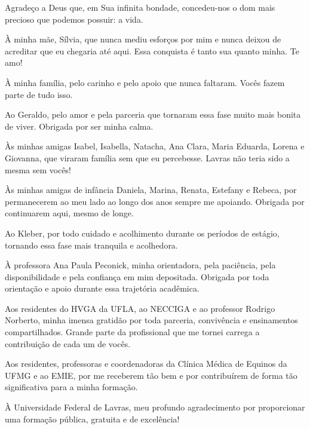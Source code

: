 \begin{agradecimentos}

Agradeço a Deus que, em Sua infinita bondade, concedeu-nos o dom mais
precioso que podemos possuir: a vida.

À minha mãe, Sílvia, que nunca mediu esforços por mim e nunca deixou de
acreditar que eu chegaria até aqui. Essa conquista é tanto sua quanto
minha. Te amo!

À minha família, pelo carinho e pelo apoio que nunca faltaram. Vocês
fazem parte de tudo isso.

Ao Geraldo, pelo amor e pela parceria que tornaram essa fase muito mais
bonita de viver. Obrigada por ser minha calma.

Às minhas amigas Isabel, Isabella, Natacha, Ana Clara, Maria Eduarda,
Lorena e Giovanna, que viraram família sem que eu percebesse. Lavras não
teria sido a mesma sem vocês!

Às minhas amigas de infância Daniela, Marina, Renata, Estefany e Rebeca,
por permanecerem ao meu lado ao longo dos anos sempre me apoiando.
Obrigada por continuarem aqui, mesmo de longe.

Ao Kleber, por todo cuidado e acolhimento durante os períodos de
estágio, tornando essa fase mais tranquila e acolhedora.

À professora Ana Paula Peconick, minha orientadora, pela paciência, pela
disponibilidade e pela confiança em mim depositada. Obrigada por toda
orientação e apoio durante essa trajetória acadêmica.

Aos residentes do HVGA da UFLA, ao NECCIGA e ao professor Rodrigo
Norberto, minha imensa gratidão por toda parceria, convivência e
ensinamentos compartilhados. Grande parte da profissional que me tornei
carrega a contribuição de cada um de vocês.

Aos residentes, professoras e coordenadoras da Clínica Médica de Equinos
da UFMG e ao EMIE, por me receberem tão bem e por contribuírem de forma
tão significativa para a minha formação.

À Universidade Federal de Lavras, meu profundo agradecimento por
proporcionar uma formação pública, gratuita e de excelência!

\end{agradecimentos}
